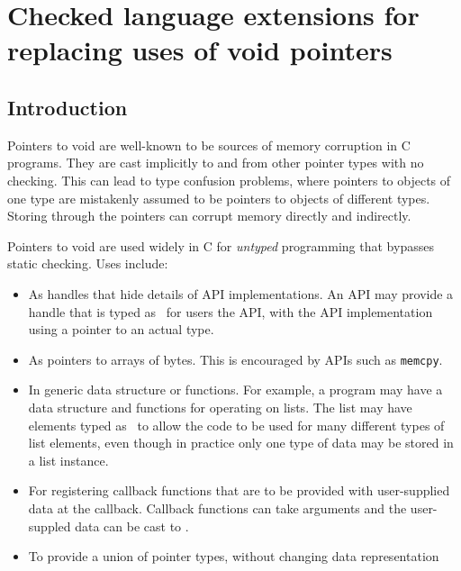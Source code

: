 
\chapter{Checked language extensions for replacing uses of void pointers}

\section{Introduction}

Pointers to void are well-known to be sources of memory corruption in C
programs. They are cast implicitly to and from other pointer types with no checking.
This can lead to type confusion problems, where pointers to objects of one type are mistakenly
assumed to be pointers to objects of different types.  Storing through the pointers
can corrupt memory directly and indirectly.

Pointers to void are used widely in C for {\em untyped} programming that bypasses
static checking.  Uses include:
\begin{itemize}
\item As handles that hide details of API implementations.  An
API may provide a handle that is typed as \uncheckedptrvoid\ for 
users the API, with the API implementation using a pointer to an actual
type.
\item As pointers to arrays of bytes.  This is encouraged by APIs such as \lstinline+memcpy+.
\item In generic data structure or functions. For example, 
a program may have a data structure and functions for operating on lists. 
The list may  have elements typed as \uncheckedptrvoid\ to allow the code
to be used for many different types of list elements, 
even though in practice only one type of data may be stored in a list instance. 
\item For registering callback functions that are to be provided with 
user-supplied data at the callback.  Callback functions can take \uncheckedptrvoid{} arguments and 
the user-suppled data can be cast to \uncheckedptrvoid{}.
\item To provide a union of pointer types, without changing data representation
\end{itemize}

